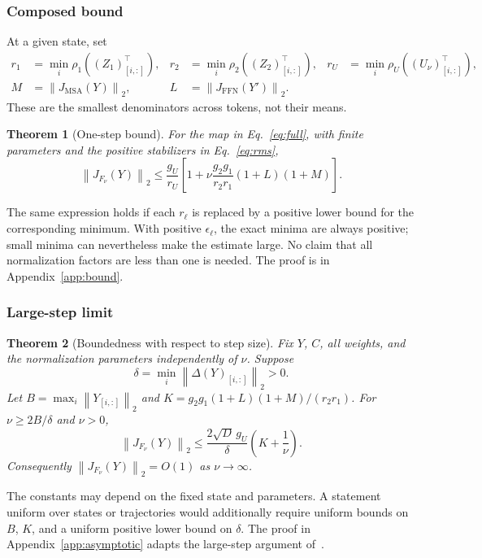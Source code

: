 \documentclass[11pt]{article}
\newtheorem{theorem}{Theorem}[section]
\newcommand{\MSA}{\operatorname{MSA}}
\newcommand{\FFN}{\operatorname{FFN}}
\newcommand{\norm}[1]{\left\|#1\right\|}
\numberwithin{equation}{section}
\begin{document}
\subsubsection{Composed bound}
At a given state, set
\begin{align}
r_1&=\min_i\rho_1((Z_1)_{[i,:]}^\top),&
r_2&=\min_i\rho_2((Z_2)_{[i,:]}^\top),&
r_U&=\min_i\rho_U((U_\nu)_{[i,:]}^\top),\label{eq:denominators}\\
M&=\norm{J_{\MSA}(Y)}_2,&
L&=\norm{J_{\FFN}(Y')}_2.\label{eq:components}
\end{align}
These are the smallest denominators across tokens, not their means.

\begin{theorem}[One-step bound]\label{thm:bound}
For the map in Eq.~\eqref{eq:full}, with finite parameters and the positive
stabilizers in Eq.~\eqref{eq:rms},
\begin{equation}\label{eq:bound}
\norm{J_{F_\nu}(Y)}_2
\leq\frac{g_U}{r_U}
\left[1+\nu\frac{g_2g_1}{r_2r_1}(1+L)(1+M)\right].
\end{equation}
\end{theorem}
The same expression holds if each $r_\ell$ is replaced by a positive lower
bound for the corresponding minimum. With positive $\epsilon_\ell$, the exact
minima are always positive; small minima can nevertheless make the estimate
large. No claim that all normalization factors are less than one is needed.
The proof is in Appendix~\ref{app:bound}.

\subsubsection{Large-step limit}
\begin{theorem}[Boundedness with respect to step size]\label{thm:asymptotic}
Fix $Y$, $C$, all weights, and the normalization parameters independently of
$\nu$. Suppose
\begin{equation}\label{eq:nondegenerate}
\delta=\min_i\norm{\Delta(Y)_{[i,:]}}_2>0.
\end{equation}
Let $B=\max_i\norm{Y_{[i,:]}}_2$ and
$K=g_2g_1(1+L)(1+M)/(r_2r_1)$. For $\nu\geq2B/\delta$ and $\nu>0$,
\begin{equation}\label{eq:asymptotic}
\norm{J_{F_\nu}(Y)}_2
\leq\frac{2\sqrt D\,g_U}{\delta}\left(K+\frac1\nu\right).
\end{equation}
Consequently $\norm{J_{F_\nu}(Y)}_2=O(1)$ as $\nu\to\infty$.
\end{theorem}
The constants may depend on the fixed state and parameters. A statement uniform
over states or trajectories would additionally require uniform bounds on $B$,
$K$, and a uniform positive lower bound on $\delta$. The proof in
Appendix~\ref{app:asymptotic} adapts the large-step argument
of~\cite{tomihari2025recurrent}.
\end{document}
